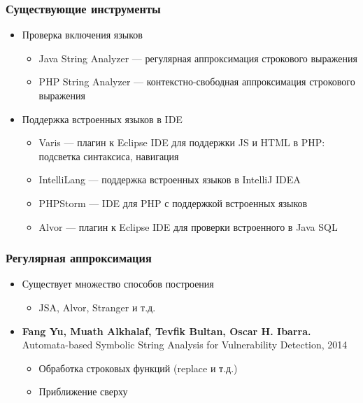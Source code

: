 \documentclass{beamer}
\begin{document}
\begin{frame}
    \transwipe[direction=90]
    \frametitle{Существующие инструменты}
    \begin{itemize}
        \item Проверка включения языков 
        \begin{itemize}
            \item Java String Analyzer --- регулярная аппроксимация строкового выражения
            \item PHP String Analyzer --- контекстно-свободная аппроксимация строкового выражения
        \end{itemize}
        \item Поддержка встроенных языков в IDE
        \begin{itemize}
            \item Varis --- плагин к Eclipse IDE для поддержки JS и HTML в PHP: подсветка синтаксиса, навигация
            \item IntelliLang --- поддержка встроенных языков в IntelliJ IDEA
            \item PHPStorm --- IDE для PHP с поддержкой встроенных языков
            \item Alvor --- плагин к Eclipse IDE для проверки встроенного в Java SQL 
        \end{itemize}        
    \end{itemize}
\end{frame}

\begin{frame}
    \transwipe[direction=90]
    \frametitle{Регулярная аппроксимация}
    \begin{itemize}
        \item Существует множество способов построения
        \begin{itemize}
          \item JSA, Alvor, Stranger и т.д.
        \end{itemize}
        \item \textbf{Fang Yu, Muath Alkhalaf, Tevfik Bultan, Oscar H. Ibarra.} Automata-based Symbolic String Analysis for Vulnerability Detection, 2014
        \begin{itemize}
          \item Обработка строковых функций (replace и т.д.)
          \item Приближение сверху
        \end{itemize}
    \end{itemize}
\end{frame}
\end{document}
